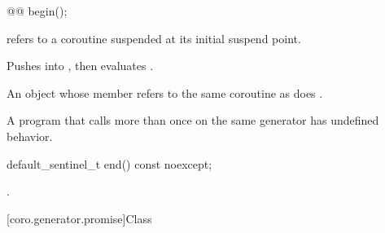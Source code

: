 %
\begin{itemdecl}
@@ begin();
\end{itemdecl}

\begin{itemdescr}
\pnum
\expects
{} refers to a coroutine
suspended at its initial suspend point.

\pnum
\effects
Pushes  into ,
then evaluates .

\pnum
\returns
An  object
whose member 
refers to the same coroutine as does
.

\pnum
\begin{note}
A program that calls  more than once on the same generator
has undefined behavior.
\end{note}
\end{itemdescr}

%
\begin{itemdecl}
default_sentinel_t end() const noexcept;
\end{itemdecl}

\begin{itemdescr}
\pnum
\returns
{}.
\end{itemdescr}

[coro.generator.promise]{Class }

